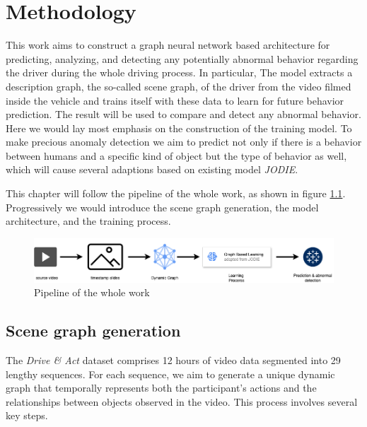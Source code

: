 \chapter{Methodology}\label{chapter:methodology}



This work aims to construct a graph neural network based architecture for predicting, analyzing, and detecting any potentially abnormal behavior regarding the driver during the whole driving process. In particular, The model extracts a description graph, the so-called scene graph, of the driver from the video filmed inside the vehicle and trains itself with these data to learn for future behavior prediction. The result will be used to compare and detect any abnormal behavior. Here we would lay most emphasis on the construction of the training model. To make precious anomaly detection we aim to predict not only if there is a behavior between humans and a specific kind of object but the type of behavior as well, which will cause several adaptions based on existing model \textit{JODIE}. 

This chapter will follow the pipeline of the whole work, as shown in figure \ref{fig:pipeline}. Progressively we would introduce the scene graph generation, the model architecture, and the training process. 

\begin{figure}
    \centering
    \includegraphics[width=\linewidth]{figures/04_pipeline.png}
    \caption{Pipeline of the whole work}
    \label{fig:pipeline}
\end{figure}


\section{Scene graph generation}

The \textit{Drive \& Act} dataset comprises 12 hours of video data segmented into 29 lengthy sequences. For each sequence, we aim to generate a unique dynamic graph that temporally represents both the participant's actions and the relationships between objects observed in the video. This process involves several key steps.


